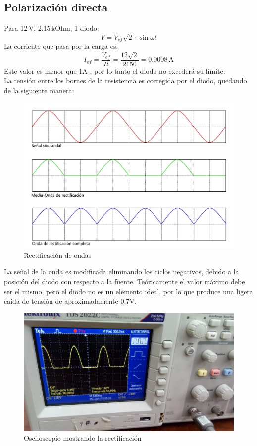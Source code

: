 \documentclass[a4paper,12pt]{report}
\begin{document}
\subsection{Polarización directa}
Para 12$\,$V, 2.15$\,$kOhm, 1 diodo:
$$
V = V_{ef}\sqrt{2}\cdot \sin \omega t
$$
La corriente que pasa por la carga es:
$$
I_{ef} = \frac{V_{ef}}{R} = \frac{12\sqrt{2}}{2150} = 0.0008\,\mathrm{A}
$$
Este valor es menor que 1A , por lo tanto el diodo no excederá su límite.\\
La tensión entre los bornes de la resistencia es corregida por el diodo, quedando de la siguiente manera:
\begin{figure}[H]
\begin{center}
\includegraphics[scale=0.35]{cir.jpg}
\caption{Rectificación de ondas}
\end{center}
\end{figure}
La señal de la onda es modificada eliminando los ciclos negativos, debido a la posición del diodo con respecto a la fuente. Teóricamente el valor máximo debe ser el mismo, pero el diodo no es un elemento ideal, por lo que produce una ligera caída de tensión de aproximadamente 0.7V.
\begin{figure}[H]
\begin{center}
\includegraphics[scale=0.4]{circ1.jpg}
\caption{Osciloscopio mostrando la rectificación}
\end{center}
\end{figure}
\end{document}
